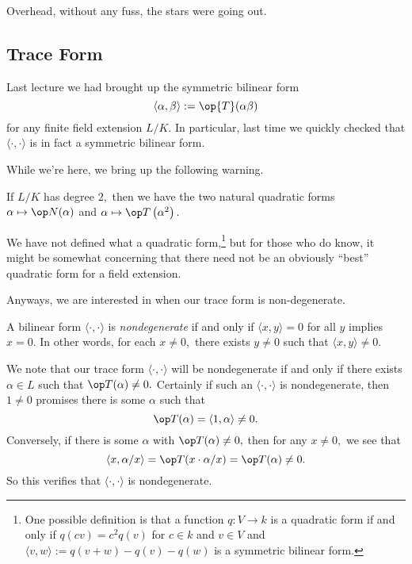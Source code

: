 











Overhead, without any fuss, the stars were going out.

\subsection{Trace Form}
Last lecture we had brought up the symmetric bilinear form
\[\langle\alpha,\beta\rangle:=\op{T}(\alpha\beta)\]
for any finite field extension $L/K.$ In particular, last time we quickly checked that $\langle\cdot,\cdot\rangle$ is in fact a symmetric bilinear form.

While we're here, we bring up the following warning.
\begin{warn}
	If $L/K$ has degree $2,$ then we have the two natural quadratic forms $\alpha\mapsto\op N(\alpha)$ and $\alpha\mapsto\op T\left(\alpha^2\right).$
\end{warn}
We have not defined what a quadratic form,\footnote{One possible definition is that a function $q:V\to k$ is a quadratic form if and only if $q(cv)=c^2q(v)$ for $c\in k$ and $v\in V$ and $\langle v,w\rangle:=q(v+w)-q(v)-q(w)$ is a symmetric bilinear form.} but for those who do know, it might be somewhat concerning that there need not be an obviously ``best'' quadratic form for a field extension.

Anyways, we are interested in when our trace form is non-degenerate.
\begin{definition}[Nondegenerate]
	A bilinear form $\langle\cdot,\cdot\rangle$ is \textit{nondegenerate} if and only if $\langle x,y\rangle=0$ for all $y$ implies $x=0.$ In other words, for each $x\ne0,$ there exists $y\ne0$ such that $\langle x,y\rangle\ne0.$
\end{definition}
We note that our trace form $\langle\cdot,\cdot\rangle$ will be nondegenerate if and only if there exists $\alpha\in L$ such that $\op T(\alpha)\ne0.$ Certainly if such an $\langle\cdot,\cdot\rangle$ is nondegenerate, then $1\ne0$ promises there is some $\alpha$ such that
\[\op T(\alpha)=\langle1,\alpha\rangle\ne0.\]
Conversely, if there is some $\alpha$ with $\op T(\alpha)\ne0,$ then for any $x\ne0,$ we see that
\[\langle x,\alpha/x\rangle=\op T(x\cdot\alpha/x)=\op T(\alpha)\ne0.\]
So this verifies that $\langle\cdot,\cdot\rangle$ is nondegenerate.


